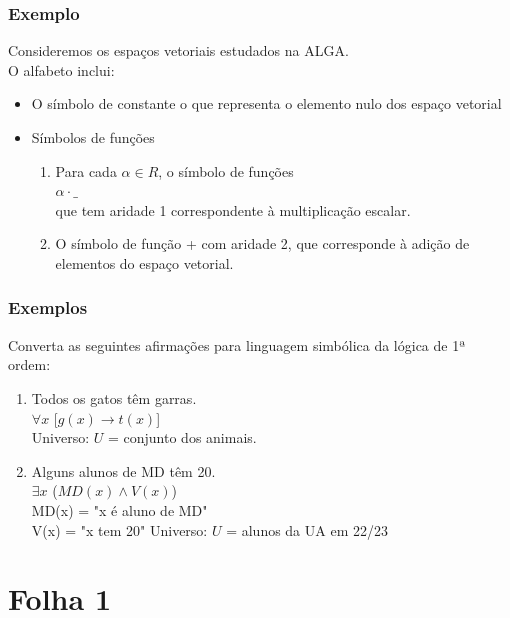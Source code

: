 \documentclass[11pt]{report}
\begin{document}
{{    \subsubsection*{Exemplo} {
    Consideremos os espaços vetoriais estudados na ALGA.\\
    O alfabeto inclui:
        \begin{itemize}
            \item O símbolo de constante o que representa o elemento nulo dos espaço vetorial
            \item Símbolos de funções
                \begin{enumerate}
                    \item Para cada $\alpha \in R$, o símbolo de funções\\ $\alpha \cdot \_$\\ que tem aridade 1 correspondente à multiplicação escalar.
                    \item O símbolo de função + com aridade 2, que corresponde à adição de elementos do espaço vetorial.
                \end{enumerate}
        \end{itemize}
    }
    \subsubsection*{Exemplos} {
    Converta as seguintes afirmações para linguagem simbólica da lógica de 1ª ordem:
    \begin{enumerate}
        \item{ \color{red}Todos \color{black} os gatos têm garras.\\
            \color{red} $\forall x$ \color{black} [$g(x) \rightarrow t(x)$]\\
            \color{red} Universo: $U$ = conjunto dos animais.
        }
        \item{ \color{red} Alguns \color{black} alunos de MD têm 20.\\
            \color{red} $\exists x$ \color{black} ($MD(x) \wedge V(x)$)\\
            MD(x) = "x é aluno de MD"\\
            V(x) = "x tem 20"
            \color{red} Universo: $U$ = alunos da UA em 22/23
        }
    \end{enumerate}
    }
    }
    }

    \section*{Folha 1}
\end{document}
